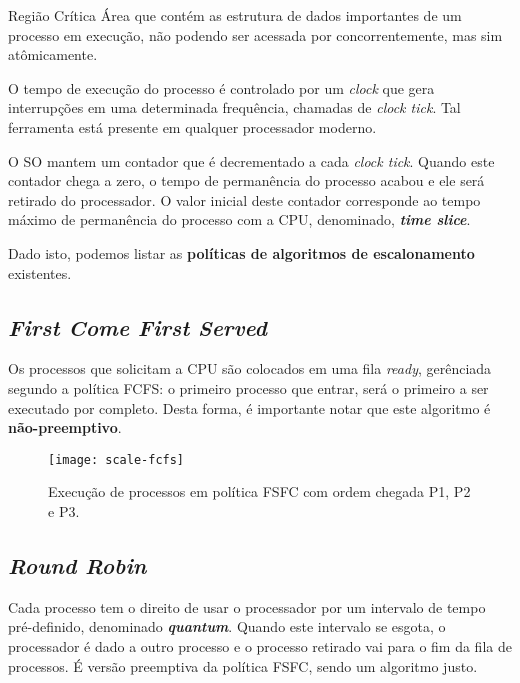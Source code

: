 \begin{definicao}{Região Crítica}
  Área que contém as estrutura de dados importantes de um processo em execução, não podendo ser acessada por concorrentemente, mas sim atômicamente.
\end{definicao}

O tempo de execução do processo é controlado por um \textit{clock} que gera interrupções em uma determinada frequência, chamadas de \textit{clock tick}. Tal ferramenta está presente em qualquer processador moderno.

O SO mantem um contador que é decrementado a cada \textit{clock tick}. Quando este contador chega a zero, o tempo de permanência do processo acabou e ele será retirado do processador. O valor inicial deste contador corresponde ao tempo máximo de permanência do processo com a CPU, denominado, \textbf{\textit{time slice}}.

Dado isto, podemos listar as \textbf{políticas de algoritmos de escalonamento} existentes.



\subsection{\textit{First Come First Served}}
Os processos que solicitam a CPU são colocados em uma fila \textit{ready}, gerênciada segundo a política FCFS: o primeiro processo que entrar, será o primeiro a ser executado por completo. Desta forma, é importante notar que este algoritmo é \textbf{não-preemptivo}.

\begin{figure}
  \centering
  \texttt{[image: scale-fcfs]}
  \caption{Execução de processos em política FSFC com ordem chegada P1, P2 e P3.}
  \label{fig:scale-fcfs}
\end{figure}





\subsection{\textit{Round Robin}}
Cada processo tem o direito de usar o processador por um intervalo de tempo pré-definido, denominado \textbf{\textit{quantum}}. Quando este intervalo se esgota, o processador é dado a outro processo e o processo retirado vai para o fim da fila de processos. É versão preemptiva da política FSFC, sendo um algoritmo justo.




